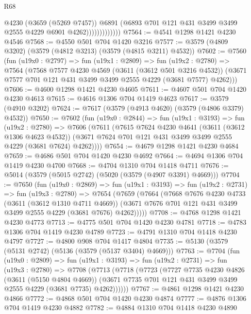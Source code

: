 \begin{lexlean}{R68}
\begin{coremodule}
                            @4230
                            (@3659 (@5269 @7457))
                            @6891
                            (@6893 @701 @121 @431 @3499 @3499 @2555 @4229 @6901 @4262)))))))))))))
@7564 := @4541 @1298 @1421 @4230 @4546
@7568 := @4550 @501 @704 @1420 @3216
@7577 := @3579 (@4809 @3202) (@3579 (@4812 @3213) (@3579 (@4815 @3211) @4532))
@7602 := @7560
    (fun (u19x0 : @2797) =>
    fun (u19x1 : @2809) =>
    fun (u19x2 : @2780) =>
    @7564
      (@7568
        @7577
        @4230
        @4569
        (@3611 (@3612 @501 @3216 @4532))
        (@3671 @7577 @701 @121 @431 @3499 @3499 @2555 @4229 (@3681 @7577) @4262)))
@7606 := @4600 @1298 @1421 @4230 @4605
@7611 := @4607 @501 @704 @1420 @4230 @4613
@7615 := @4616 @1306 @704 @1419 @4623
@7617 := @3579 (@4910 @3202)
@7624 := @7617 (@3579 (@4913 @4620) (@3579 (@4806 @3379) @4532))
@7650 := @7602
    (fun (u19x0 : @2844) =>
    fun (u19x1 : @3193) =>
    fun (u19x2 : @2780) =>
    @7606
      (@7611
        (@7615
          @7624
          @4230
          @4641
          (@3611 (@3612 @1306 @4623 @4532))
          (@3671 @7624 @701 @121 @431 @3499 @3499 @2555 @4229 (@3681 @7624) @4262))))
@7654 := @4679 @1298 @1421 @4230 @4684
@7659 := @4686 @501 @704 @1420 @4230 @4692
@7664 := @4694 @1306 @704 @1419 @4230 @4700
@7668 := @4704 @1310 @704 @1418 @4711
@7676 := @5014 (@3579 (@5015 @2742) (@5020 (@3579 (@4907 @3391) @4669)))
@7704 := @7650
    (fun (u19x0 : @2869) =>
    fun (u19x1 : @3193) =>
    fun (u19x2 : @2731) =>
    fun (u19x3 : @2780) =>
    @7654
      (@7659
        (@7664
          (@7668
            @7676
            @4230
            @4733
            (@3611 (@3612 @1310 @4711 @4669))
            (@3671 @7676 @701 @121 @431 @3499 @3499 @2555 @4229 (@3681 @7676) @4262)))))
@7708 := @4768 @1298 @1421 @4230 @4773
@7713 := @4775 @501 @704 @1420 @4230 @4781
@7718 := @4783 @1306 @704 @1419 @4230 @4789
@7723 := @4791 @1310 @704 @1418 @4230 @4797
@7727 := @4800 @908 @704 @1417 @4804
@7735 := @5130 (@3579 (@5131 @2742) (@5136 (@3579 (@5137 @3404) @4669)))
@7763 := @7704
    (fun (u19x0 : @2809) =>
    fun (u19x1 : @3193) =>
    fun (u19x2 : @2731) =>
    fun (u19x3 : @2780) =>
    @7708
      (@7713
        (@7718
          (@7723
            (@7727
              @7735
              @4230
              @4826
              (@3611 (@5150 @4804 @4669))
              (@3671 @7735 @701 @121 @431 @3499 @3499 @2555 @4229 (@3681 @7735) @4262))))))
@7767 := @4861 @1298 @1421 @4230 @4866
@7772 := @4868 @501 @704 @1420 @4230 @4874
@7777 := @4876 @1306 @704 @1419 @4230 @4882
@7782 := @4884 @1310 @704 @1418 @4230 @4890

\end{coremodule}
\end{lexlean}
